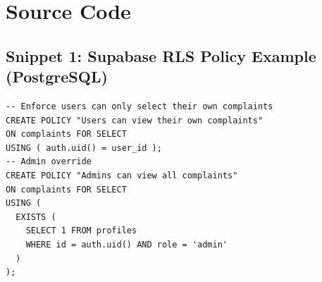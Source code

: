 \documentclass[12pt, a4paper, twoside, openany]{report}
\begin{document}
\appendix
{}
\chapter{Source Code}
\section*{Snippet 1: Supabase RLS Policy Example (PostgreSQL)}
\begin{footnotesize}
\begin{verbatim}
-- Enforce users can only select their own complaints
CREATE POLICY "Users can view their own complaints"
ON complaints FOR SELECT
USING ( auth.uid() = user_id );
-- Admin override
CREATE POLICY "Admins can view all complaints"
ON complaints FOR SELECT
USING ( 
  EXISTS (
    SELECT 1 FROM profiles 
    WHERE id = auth.uid() AND role = 'admin'
  )
);
\end{verbatim}
\end{footnotesize}
\vspace{1cm}
\end{document}
